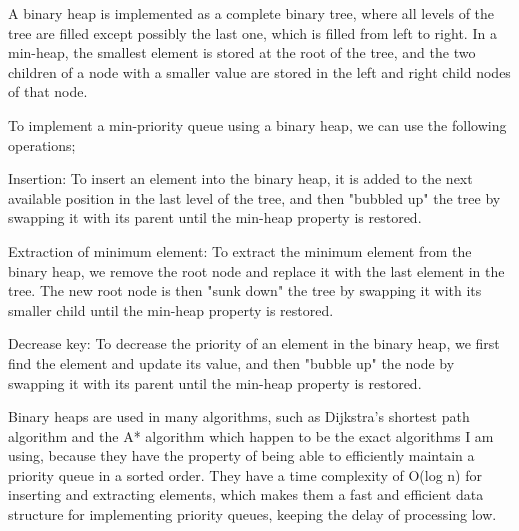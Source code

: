\begin{FlushLeft}
    A binary heap is implemented as a complete binary tree, where all levels of the tree are filled except possibly the last one, which is filled from left to right. In a min-heap, the smallest element is stored at the root of the tree, and the two children of a node with a smaller value are stored in the left and right child nodes of that node.\\ \bk
    
    To implement a min-priority queue using a binary heap, we can use the following operations;\\ \bk

    Insertion: To insert an element into the binary heap, it is added to the next available position in the last level of the tree, and then "bubbled up" the tree by swapping it with its parent until the min-heap property is restored.\\ \bk
    
    Extraction of minimum element: To extract the minimum element from the binary heap, we remove the root node and replace it with the last element in the tree. The new root node is then "sunk down" the tree by swapping it with its smaller child until the min-heap property is restored.\\ \bk
    
    Decrease key: To decrease the priority of an element in the binary heap, we first find the element and update its value, and then "bubble up" the node by swapping it with its parent until the min-heap property is restored.\\ \bk
    
    Binary heaps are used in many algorithms, such as Dijkstra's shortest path algorithm and the A* algorithm which happen to be the exact algorithms I am using, because they have the property of being able to efficiently maintain a priority queue in a sorted order. They have a time complexity of O(log n) for inserting and extracting elements, which makes them a fast and efficient data structure for implementing priority queues, keeping the delay of processing low.\\ \bk

    \bk








\end{FlushLeft}